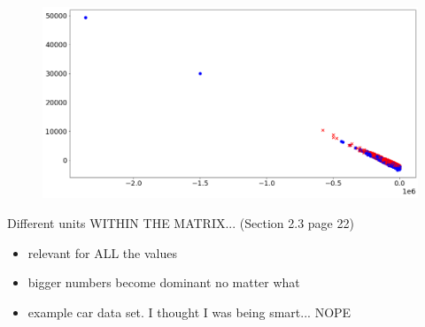 \begin{center}
    \begin{figure}[h]
      \centering
      \includegraphics[width=0.94\linewidth]{external_content/media/wrong_units/graph.png}
      \captionsetup{justification=centering}
    \end{figure}
\end{center}


Different units WITHIN THE MATRIX... \cite{Jolliffe2002book} (Section 2.3 page 22)

\begin{itemize}
	\item relevant for ALL the values
	\item bigger numbers become dominant no matter what
	\item example car data set. I thought I was being smart... NOPE
\end{itemize}

\clearpage
